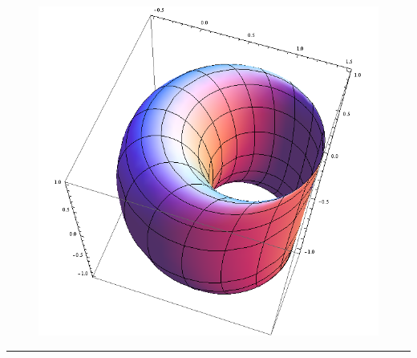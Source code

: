 \documentclass[letterpaper,10pt,english]{sphinxmanual}
\begin{document}
\begin{figure}[htbp]
\centering

\includegraphics[width=0.500\linewidth]{5d.png}
\end{figure}


\bigskip\hrule{}\bigskip
\end{document}
